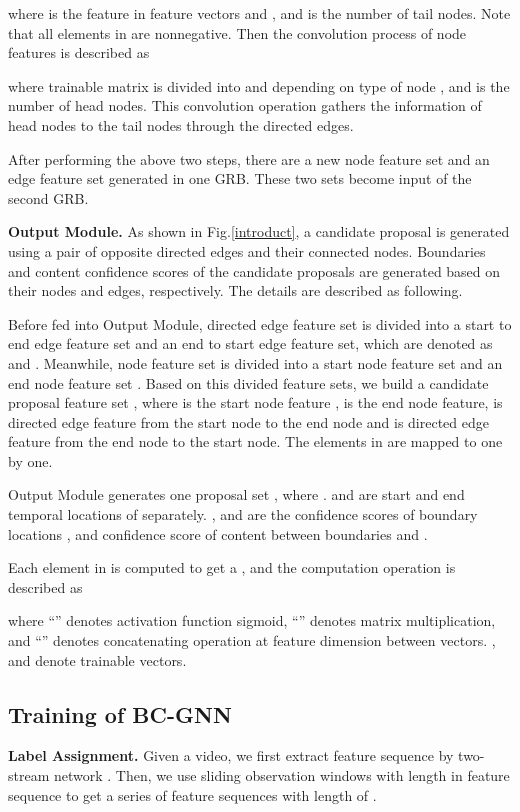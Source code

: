 \documentclass[runningheads]{llncs}
\begin{document}
where  is the  feature in feature vectors  and , and  is the number of tail nodes. Note that all elements in  are nonnegative.
Then the convolution process of node features is described as

where trainable matrix  is divided into  and  depending on type of node , and  is the number of head nodes. This convolution operation gathers the information of head nodes to the tail nodes through the directed edges.

After performing the above two steps, there are a new node feature set  and an edge feature set   generated in one GRB. These two sets become input of the second GRB.


\noindent\textbf{Output Module.}
As shown in Fig.\ref{introduct}, a candidate proposal is generated using a pair of opposite directed edges and their connected nodes. Boundaries and content confidence scores of the candidate proposals are generated based on their nodes and edges, respectively. The details are described as following.

Before fed into Output Module, directed edge feature set  is divided into a start to end edge feature set and an end to start edge feature set, which are denoted as  and
 .
Meanwhile, node feature set  is divided into a start node feature set  and an end node feature set .
Based on this divided feature sets, we build a candidate proposal feature set
, where  is the  start node feature ,
  is the  end node feature,
  is directed edge feature from the  start node to the  end node
 and  is directed edge feature from the  end node to the  start node. The elements in  are mapped to  one by one.

Output Module generates one proposal set , where .   and  are start and end temporal locations of  separately. ,  and  are the confidence scores of boundary locations ,  and confidence score of content between boundaries  and .

Each element in  is computed to get a , and the computation operation is described as

where ``'' denotes activation function sigmoid, ``'' denotes matrix multiplication, and ``'' denotes concatenating operation at feature dimension between vectors. ,  and  denote trainable vectors.


\subsection{Training of BC-GNN}

\noindent\textbf{Label Assignment.}
Given a video, we first extract feature sequence by two-stream network \cite{two-stream}. Then, we use sliding observation windows with length  in feature sequence to get a series of feature sequences with length of .
\end{document}
